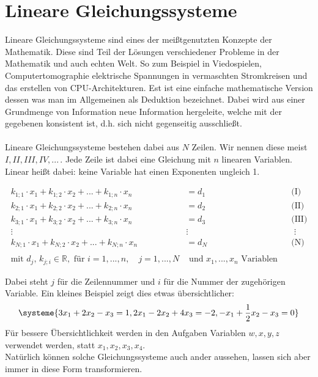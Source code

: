 \documentclass[a4paper,12pt]{article}
\newcommand{\Redbox}[1]{
	{
		\vspace*{0.1cm}
		\begin{tcolorbox}[breakable,colback=yellow!0,colframe=red!65!black,width=\linewidth ]
			{#1}
		\end{tcolorbox}
		
		
	}
}
\begin{document}
	\section{Lineare Gleichungssysteme}
	Lineare Gleichungssysteme sind eines der meißtgenutzten Konzepte der Mathematik. Diese sind Teil der Lösungen verschiedener Probleme in der Mathematik und auch echten Welt. So zum Beispiel in Viedospielen, Computertomographie elektrische Spannungen in vermaschten Stromkreisen und das erstellen von CPU-Architekturen. Est ist eine einfache mathematische Version dessen was man im Allgemeinen als Deduktion bezeichnet. Dabei wird aus einer Grundmenge von Information neue Information hergeleite, welche mit der gegebenen konsistent ist, d.h. sich nicht gegenseitig ausschließt.\\\\
	Lineare Gleichungssysteme bestehen dabei aus $N$ Zeilen. Wir nennen diese meist $I,II,III,IV,...\,$. Jede Zeile ist dabei eine Gleichung mit $n$ linearen Variablen. Linear heißt dabei: keine Variable hat einen Exponenten ungleich 1.
		\Redbox{\begin{align*}
				k_{1;1}\cdot x_1 + k_{1;2}\cdot x_2+ ... + k_{1;n}\cdot x_n 	&=d_1&&\text{(I)}\\
				k_{2;1}\cdot x_1 + k_{2;2}\cdot x_2+ ... + k_{2;n}\cdot x_n 	&=d_2&&\text{(II)}\\
				k_{3;1}\cdot x_1 + k_{3;2}\cdot x_2+ ... + k_{3;n}\cdot x_n 	&=d_3&&\text{(III)}\\
				\vdots\qquad \qquad\qquad  &\vdots &&\,\,\vdots\\
				k_{N;1}\cdot x_1 + k_{N;2}\cdot x_2+ ... + k_{N;n}\cdot x_n 	&=d_N&&\text{(N)}\\\\
				\text{mit } d_j,\,k_{j;i}\in \mathds{R},\text{ für } i=1,...,n,\quad j=1,...,N &\text{ und } x_1,...,x_n \text{ Variablen} 
		\end{align*}}
	Dabei steht $j$ für die Zeilennummer und $i$ für die Nummer der zugehörigen Variable. Ein kleines Beispiel zeigt dies etwas übersichtlicher:
	\[\systeme{
		3x_1 + 2x_2 - x_3 = 1,
		2x_1 - 2x_2 + 4x_3 = -2,
		-x_1 + \frac{1}{2}x_2 - x_3 = 0
	}\]
	Für bessere Übersichtlichkeit werden in den Aufgaben Variablen $w,x,y,z$ verwendet werden, statt $x_1,x_2,x_3,x_4$.\\
	Natürlich können solche Gleichungssysteme auch ander aussehen, lassen sich aber immer in diese Form transformieren.
\end{document}
